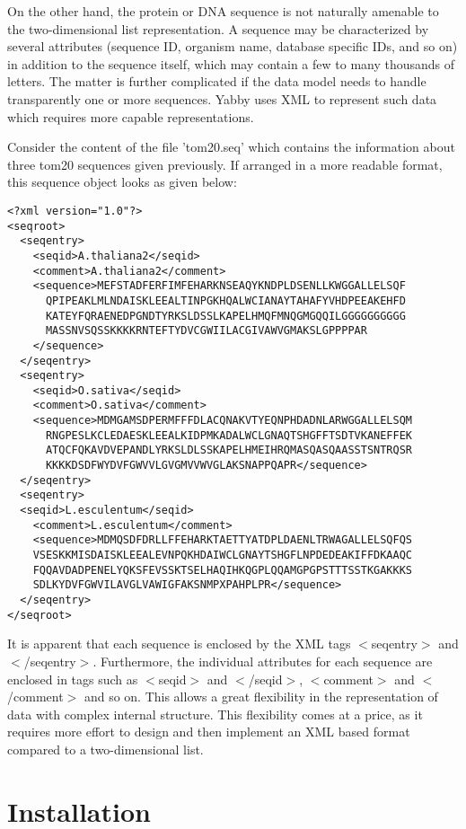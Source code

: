 On the other hand, the protein or DNA sequence is not naturally
amenable to the two-dimensional list representation. A sequence
may be characterized by several attributes (sequence ID, organism
name, database specific IDs, and so on) in addition to the sequence
itself, which may contain a few to many thousands of letters. The
matter is further complicated if the data model needs to handle
transparently one or more sequences. Yabby uses XML to represent
such data which requires more capable representations.

Consider the content of the file 'tom20.seq' which contains
the information about three tom20 sequences given previously.
If arranged in a more readable format, this sequence object
looks as given below:

\begin{verbatim}
<?xml version="1.0"?>
<seqroot>
  <seqentry>
    <seqid>A.thaliana2</seqid>
    <comment>A.thaliana2</comment>
    <sequence>MEFSTADFERFIMFEHARKNSEAQYKNDPLDSENLLKWGGALLELSQF
      QPIPEAKLMLNDAISKLEEALTINPGKHQALWCIANAYTAHAFYVHDPEEAKEHFD
      KATEYFQRAENEDPGNDTYRKSLDSSLKAPELHMQFMNQGMGQQILGGGGGGGGGG
      MASSNVSQSSKKKKRNTEFTYDVCGWIILACGIVAWVGMAKSLGPPPPAR
    </sequence>
  </seqentry>
  <seqentry>
    <seqid>O.sativa</seqid>
    <comment>O.sativa</comment>
    <sequence>MDMGAMSDPERMFFFDLACQNAKVTYEQNPHDADNLARWGGALLELSQM
      RNGPESLKCLEDAESKLEEALKIDPMKADALWCLGNAQTSHGFFTSDTVKANEFFEK
      ATQCFQKAVDVEPANDLYRKSLDLSSKAPELHMEIHRQMASQASQAASSTSNTRQSR
      KKKKDSDFWYDVFGWVVLGVGMVVWVGLAKSNAPPQAPR</sequence>
  </seqentry>
  <seqentry>
  <seqid>L.esculentum</seqid>
    <comment>L.esculentum</comment>
    <sequence>MDMQSDFDRLLFFEHARKTAETTYATDPLDAENLTRWAGALLELSQFQS
    VSESKKMISDAISKLEEALEVNPQKHDAIWCLGNAYTSHGFLNPDEDEAKIFFDKAAQC
    FQQAVDADPENELYQKSFEVSSKTSELHAQIHKQGPLQQAMGPGPSTTTSSTKGAKKKS
    SDLKYDVFGWVILAVGLVAWIGFAKSNMPXPAHPLPR</sequence>
  </seqentry>
</seqroot>
\end{verbatim}

It is apparent that each sequence is enclosed by the XML tags
$<$seqentry$>$ and $<$/seqentry$>$. Furthermore, the individual
attributes for each sequence are enclosed in tags such as
$<$seqid$>$ and $<$/seqid$>$, $<$comment$>$ and $<$/comment$>$
and so on. This allows a great flexibility in the representation
of data with complex internal structure. This flexibility comes
at a price, as it requires more effort to design and then implement
an XML based format compared to a two-dimensional list. 

\section{Installation}

